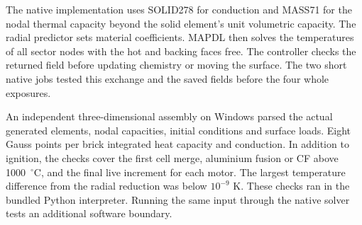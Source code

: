 The native implementation uses SOLID278 for conduction and MASS71
for the nodal thermal capacity beyond the solid element's unit volumetric
capacity. The radial predictor sets material coefficients. MAPDL then solves
the temperatures of all sector nodes with the hot and backing faces free. The
controller checks the returned field before updating chemistry or moving the
surface. The two short native jobs tested this exchange and the saved
fields before the four whole exposures.

An independent three-dimensional assembly on Windows parsed the actual generated
elements, nodal capacities, initial conditions and surface loads. Eight Gauss
points per brick integrated heat capacity and conduction. In addition to
ignition, the checks cover the first cell merge, aluminium fusion or CF above
1000~$^\circ$C, and the final live increment for each motor. The largest
temperature difference from the radial reduction was below $10^{-9}$ K.
These checks ran in the bundled Python interpreter. Running the same input
through the native solver tests an additional software boundary.
\clearpage
